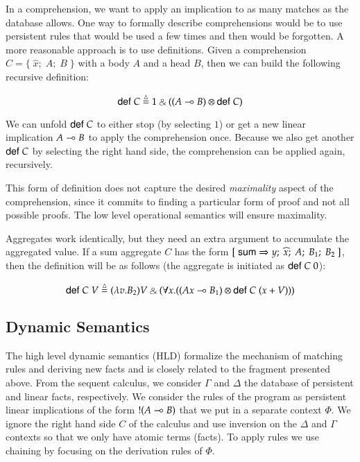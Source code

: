 In a comprehension, we want to apply an implication to as many matches as the database allows. One way to formally describe comprehensions would be to use persistent
rules that would be used a few times and then would be forgotten. A more reasonable approach is to use
definitions. Given a comprehension $C = \{ \; \widehat{x}; \; A; \; B \; \}$ with a body $A$ and a head $B$, then we can build the following recursive definition:

\[
\compr{C} \defeq 1 \with ((A \lolli B) \otimes \compr{C})
\]

We can unfold $\mathsf{def} \; C$ to either stop (by selecting $1$) or get a new linear implication $A \multimap B$
to apply the comprehension once. Because we also get another $\mathsf{def} \; C$ by selecting the right hand side,
the comprehension can be applied again, recursively.

This form of definition does not capture the desired \emph{maximality} aspect of the comprehension,
since it commits to finding a particular form of proof and not all possible proofs. The low level
operational semantics will ensure maximality.

Aggregates work identically, but they need an extra argument to accumulate the aggregated value. If a sum aggregate $C$ has the form $[\;\mathsf{sum} \Rightarrow y; \; \widehat{x}; \; A; \; B_1; \; B_2 \;]$, then the definition will be as follows (the aggregate is initiated as $\mathsf{def} \; C \; 0$):

\[
\compr{C} \; V \defeq (\lambda v. B_2)V \with (\forall x. ((Ax \lolli B_1) \otimes \compr{C} \; (x + V)))
\]

\subsection{Dynamic Semantics}

The high level dynamic semantics (HLD) formalize the mechanism of matching rules and deriving new facts and is closely related to the fragment presented above.
From the sequent calculus, we consider $\Gamma$ and $\Delta$ the database of persistent and linear facts, respectively.
We consider the rules of the program as persistent linear implications of the form ${!} (A \multimap B)$ that we put in a separate context $\Phi$.
We ignore the right hand side $C$ of the calculus and use inversion on the $\Delta$ and $\Gamma$ contexts so that we only have atomic terms (facts). To apply rules
we use chaining by focusing on the derivation rules of $\Phi$.

